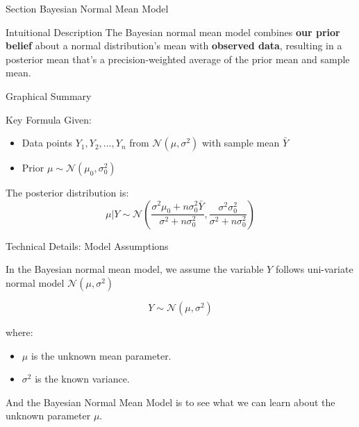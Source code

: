 
\begin{frame}{Section}
\centering
\Huge{Bayesian Normal Mean Model}
\end{frame}


\begin{frame}{Intuitional Description}
The Bayesian normal mean model combines \textbf{our prior belief} about a normal distribution's mean with \textbf{observed data}, resulting in a posterior mean that's a precision-weighted average of the prior mean and sample mean.
\end{frame}

\begin{frame}{Graphical Summary}

\end{frame}


\begin{frame}{Key Formula}
Given:
\begin{itemize}
\item Data points $Y_1, Y_2, \ldots, Y_n$ from $\mathcal{N}(\mu, \sigma^2)$ with sample mean $\bar{Y}$
\item Prior $\mu \sim \mathcal{N}(\mu_0, \sigma_0^2)$
\end{itemize}

The posterior distribution is:
$$\mu | Y \sim \mathcal{N}\left(\frac{\sigma^2\mu_0 + n\sigma_0^2\bar{Y}}{\sigma^2 + n\sigma_0^2}, \frac{\sigma^2\sigma_0^2}{\sigma^2 + n\sigma_0^2}\right)$$
\end{frame}


\begin{frame}{Technical Details: Model Assumptions}

In the Bayesian normal mean model, we assume the variable $Y$ follows uni-variate normal model $\mathcal{N}(\mu, \sigma^2)$

$$
Y \sim \mathcal{N}(\mu, \sigma^2)
$$

where:
\begin{itemize}
\item $ \mu $ is the unknown mean parameter.
\item $ \sigma^2 $ is the known variance.
\end{itemize}

And the Bayesian Normal Mean Model is to see what we can learn about the unknown parameter $\mu$.

\end{frame}

